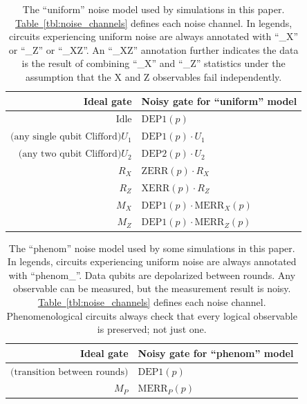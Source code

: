 \documentclass[onecolumn,unpublished,a4paper]{quantumarticle}
\theoremstyle{definition}
\theoremstyle{definition}
\theoremstyle{definition}
\newcommand{\tbl}[1]{\hyperref[tbl:#1]{Table~\ref*{tbl:#1}}}
\begin{document}
\begin{table}[H]
    \centering
    \begin{tabular}{|r|l|}
    \hline
    Ideal gate & Noisy gate for ``uniform'' model
    \\
    \hline
    $\text{Idle}$ & $\text{DEP1}(p)$
    \\
    $\text{(any single qubit Clifford)} U_1$ & $\text{DEP1}(p) \cdot U_1$
    \\
    $\text{(any two qubit Clifford)} U_2$ & $\text{DEP2}(p) \cdot U_2$
    \\
    \hline
    $R_X$ & $\text{ZERR}(p) \cdot R_X$
    \\
    $R_Z$ & $\text{XERR}(p) \cdot R_Z$
    \\
    \hline
    $M_X$ & $\text{DEP1}(p) \cdot \text{MERR}_X(p)$
    \\
    $M_Z$ & $\text{DEP1}(p) \cdot \text{MERR}_Z(p)$
    \\
    \hline
    \end{tabular}
    \caption{
        The ``uniform'' noise model used by simulations in this paper.
        \tbl{noise_channels} defines each noise channel.
        In legends, circuits experiencing uniform noise are always annotated with ``\_X'' or ``\_Z'' or ``\_XZ''.
        An ``\_XZ'' annotation further indicates the data is the result of combining ``\_X'' and ``\_Z'' statistics under the assumption that the X and Z observables fail independently.
    }
    \label{tbl:noise_model_uniform}
\end{table}

\begin{table}[H]
    \centering
    \begin{tabular}{|r|l|}
    \hline
    Ideal gate & Noisy gate for ``phenom'' model
    \\
    \hline
    $\text{(transition between rounds)}$ & $\text{DEP1}(p)$ \\
    \hline
    $M_{P}$ & $\text{MERR}_P(p)$
    \\
    \hline
    \end{tabular}
    \caption{
        The ``phenom'' noise model used by some simulations in this paper.
        In legends, circuits experiencing uniform noise are always annotated with ``phenom\_''.
        Data qubits are depolarized between rounds.
        Any observable can be measured, but the measurement result is noisy.
        \tbl{noise_channels} defines each noise channel.
        Phenomenological circuits always check that every logical observable is preserved; not just one.
    }
    \label{tbl:noise_model_phenom}
\end{table}
\end{document}
